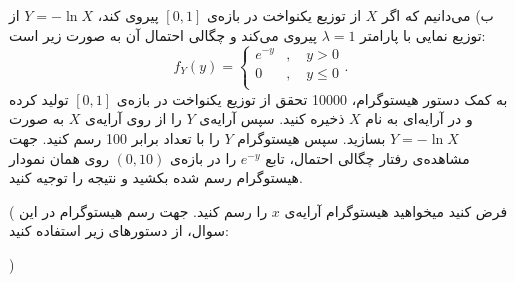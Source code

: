 ب) می‌دانیم که اگر 
$
X
$
از توزیع یکنواخت در بازه‌ی 
$
[0,1]
$
پیروی کند، 
$
Y=-\ln X
$
از توزیع نمایی با پارامتر 
$
\lambda=1
$
پیروی می‌کند و چگالی احتمال آن به صورت زیر است:
$$
f_Y(y)=\begin{cases}
e^{-y}&,\quad y>0\\
0&,\quad y\le0\\
\end{cases}.
$$
به کمک دستور هیستوگرام، 10000 تحقق از توزیع یکنواخت در بازه‌ی 
$
[0,1]
$
تولید کرده و در آرایه‌ای به نام
$
X
$
ذخیره کنید. سپس آرایه‌ی
$
Y
$
را از روی آرایه‌ی
$
X
$
به صورت
$
Y=-\ln X
$
بسازید. سپس هیستوگرام $Y$ را با تعداد  برابر 100 رسم کنید. جهت مشاهده‌ی رفتار چگالی احتمال، تابع
$
e^{-y}
$
را در بازه‌ی 
$
(0,10)
$
روی همان نمودار هیستوگرام رسم شده بکشید و نتیجه را توجیه کنید.

(
فرض کنید میخواهید هیستوگرام آرایه‌ی $x$ را رسم کنید. جهت رسم هیستوگرام در این سوال، از دستورهای زیر استفاده کنید:


)

%

